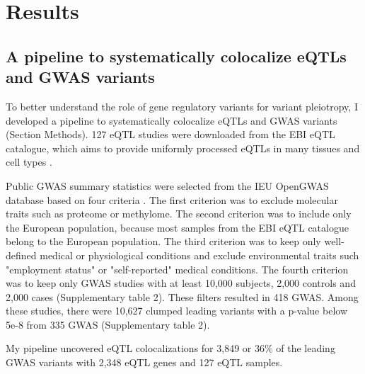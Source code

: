 \section*{Results}\label{s:results}

\subsection*{A pipeline to systematically colocalize eQTLs and GWAS variants}

To better understand the role of gene regulatory variants for variant pleiotropy, I developed a pipeline to systematically colocalize eQTLs and GWAS variants (Section Methods).
%
127 eQTL studies were downloaded from the EBI eQTL catalogue, which aims to provide uniformly processed eQTLs in many tissues and cell types \citep{2021.Alasoo.Kerimov}.

Public GWAS summary statistics were selected from the IEU OpenGWAS database based on four criteria \citep{2018.Parkinson.Buniello}.
%
The first criterion was to exclude molecular traits such as proteome or methylome.
%	
The second criterion was to include only the European population, because most samples from the EBI eQTL catalogue belong to the European population.
%
The third criterion was to keep only well-defined medical or physiological conditions and exclude environmental traits such "employment status" or "self-reported" medical conditions.
%
The fourth criterion was to keep only GWAS studies with at least 10,000 subjects, 2,000 controls and 2,000 cases (Supplementary table 2).
%
These filters resulted in 418 GWAS.
%
Among these studies, there were 10,627 clumped leading variants with a p-value below 5e-8 from 335 GWAS (Supplementary table 2).

My pipeline uncovered eQTL colocalizations for 3,849 or 36$\%$ of the leading GWAS variants with 2,348 eQTL genes and 127 eQTL samples.


